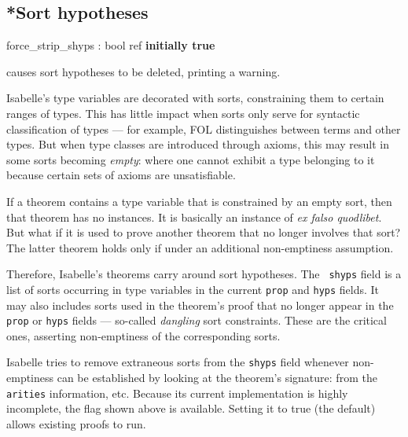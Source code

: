 \subsection{*Sort hypotheses} 
\begin{ttbox} 
force_strip_shyps : bool ref \hfill{\bf initially true}
\end{ttbox}

\begin{ttdescription}
\item[\ttindexbold{force_strip_shyps}]
causes sort hypotheses to be deleted, printing a warning.
\end{ttdescription}

Isabelle's type variables are decorated with sorts, constraining them to
certain ranges of types.  This has little impact when sorts only serve for
syntactic classification of types --- for example, FOL distinguishes between
terms and other types.  But when type classes are introduced through axioms,
this may result in some sorts becoming {\em empty\/}: where one cannot exhibit
a type belonging to it because certain sets of axioms are unsatisfiable.

If a theorem contains a type variable that is constrained by an empty
sort, then that theorem has no instances.  It is basically an instance
of {\em ex falso quodlibet}.  But what if it is used to prove another
theorem that no longer involves that sort?  The latter theorem holds
only if under an additional non-emptiness assumption.

Therefore, Isabelle's theorems carry around sort hypotheses.  The {\tt
shyps} field is a list of sorts occurring in type variables in the current
{\tt prop} and {\tt hyps} fields.  It may also includes sorts used in the
theorem's proof that no longer appear in the {\tt prop} or {\tt hyps}
fields --- so-called {\em dangling\/} sort constraints.  These are the
critical ones, asserting non-emptiness of the corresponding sorts.
 
Isabelle tries to remove extraneous sorts from the {\tt shyps} field whenever
non-emptiness can be established by looking at the theorem's signature: from
the {\tt arities} information, etc.  Because its current implementation is
highly incomplete, the flag shown above is available.  Setting it to true (the
default) allows existing proofs to run.


